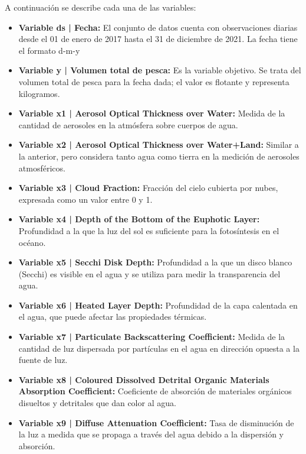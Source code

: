 A continuación se describe cada una de las variables:
\begin{itemize}
    \item \textbf{Variable ds | Fecha:} El conjunto de datos cuenta con observaciones diarias desde el 01 de enero de 2017 hasta el 31 de diciembre de 2021. La fecha tiene el formato d-m-y
    \item \textbf{Variable y | Volumen total de pesca:} Es la variable objetivo. Se trata del volumen total de pesca para la fecha dada; el valor es flotante y representa kilogramos.
       \item \textbf{Variable x1 | Aerosol Optical Thickness over Water:}
    Medida de la cantidad de aerosoles en la atmósfera sobre cuerpos de agua.

    \item \textbf{Variable x2 | Aerosol Optical Thickness over Water+Land:}
    Similar a la anterior, pero considera tanto agua como tierra en la medición de aerosoles atmosféricos.

    \item \textbf{Variable x3 | Cloud Fraction:}
    Fracción del cielo cubierta por nubes, expresada como un valor entre 0 y 1.

    \item \textbf{Variable x4 | Depth of the Bottom of the Euphotic Layer:}
    Profundidad a la que la luz del sol es suficiente para la fotosíntesis en el océano.

    \item \textbf{Variable x5 | Secchi Disk Depth:}
    Profundidad a la que un disco blanco (Secchi) es visible en el agua y se utiliza para medir la transparencia del agua.

    \item \textbf{Variable x6 | Heated Layer Depth:}
    Profundidad de la capa calentada en el agua, que puede afectar las propiedades térmicas.

    \item \textbf{Variable x7 | Particulate Backscattering Coefficient:}
    Medida de la cantidad de luz dispersada por partículas en el agua en dirección opuesta a la fuente de luz.

    \item \textbf{Variable x8 | Coloured Dissolved Detrital Organic Materials Absorption Coefficient:}
    Coeficiente de absorción de materiales orgánicos disueltos y detritales que dan color al agua.

    \item \textbf{Variable x9 | Diffuse Attenuation Coefficient:}
    Tasa de disminución de la luz a medida que se propaga a través del agua debido a la dispersión y absorción.


\end{itemize}
